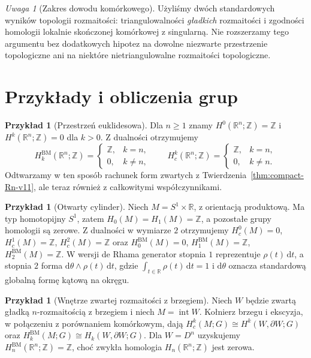 \documentclass[11pt,a4paper,oneside]{report}
\newcommand{\R}{\mathbb{R}}
\newcommand{\Z}{\mathbb{Z}}
\newcommand{\dd}{\mathrm d}
\theoremstyle{plain}
\theoremstyle{definition}
\newtheorem{przyklad}[twierdzenie]{Przykład}
\theoremstyle{remark}
\newtheorem{uwaga}[twierdzenie]{Uwaga}
\begin{document}
\begin{uwaga}[Zakres dowodu komórkowego]
Użyliśmy dwóch standardowych wyników topologii
rozmaitości: triangulowalności \emph{gładkich}
rozmaitości i zgodności homologii lokalnie
skończonej komórkowej z singularną. Nie rozszerzamy
tego argumentu bez dodatkowych hipotez na dowolne
niezwarte przestrzenie topologiczne ani na
niektóre nietriangulowalne rozmaitości topologiczne.
\end{uwaga}

\section{Przykłady i obliczenia grup}
\begin{przyklad}[Przestrzeń euklidesowa]
Dla $n\ge1$ znamy $H^0(\R^n;\Z)=\Z$ i
$H^k(\R^n;\Z)=0$ dla $k>0$.
Z dualności otrzymujemy
\[
H_k^{\mathrm{BM}}(\R^n;\Z)=
\begin{cases}\Z,&k=n,\\0,&k\ne n,\end{cases}
\qquad
H_c^k(\R^n;\Z)=
\begin{cases}\Z,&k=n,\\0,&k\ne n.\end{cases}
\]
Odtwarzamy w ten sposób rachunek form zwartych
z Twierdzenia~\ref{thm:compact-Rn-v11},
ale teraz również z całkowitymi współczynnikami.
\end{przyklad}

\begin{przyklad}[Otwarty cylinder]
Niech $M=S^1\times\R$, z orientacją produktową.
Ma typ homotopijny $S^1$, zatem $H_0(M)=H_1(M)=\Z$,
a pozostałe grupy homologii są zerowe.
Z dualności w wymiarze $2$ otrzymujemy
$H_c^0(M)=0$, $H_c^1(M)=\Z$, $H_c^2(M)=\Z$ oraz
$H_0^{\mathrm{BM}}(M)=0$, $H_1^{\mathrm{BM}}(M)=\Z$,
$H_2^{\mathrm{BM}}(M)=\Z$.
W wersji de Rhama generator stopnia $1$ reprezentuje
$\rho(t)\,\dd t$, a stopnia $2$ forma
$\dd\theta\wedge\rho(t)\,\dd t$, gdzie
$\int_{t\in\R}\rho(t)\,\dd t=1$ i $\dd\theta$ oznacza
standardową globalną formę kątową na okręgu.
\end{przyklad}

\begin{przyklad}[Wnętrze zwartej rozmaitości z brzegiem]
Niech $W$ będzie zwartą gładką $n$-rozmaitością
z brzegiem i niech $M=\operatorname{int}W$.
Kołnierz brzegu i ekscyzja, w połączeniu z
porównaniem komórkowym, dają
$H_c^k(M;G)\cong H^k(W,\partial W;G)$ oraz
$H_k^{\mathrm{BM}}(M;G)\cong H_k(W,\partial W;G)$.
Dla $W=D^n$ uzyskujemy
$H_n^{\mathrm{BM}}(\R^n;\Z)=\Z$,
choć zwykła homologia $H_n(\R^n;\Z)$ jest zerowa.
\end{przyklad}
\end{document}

